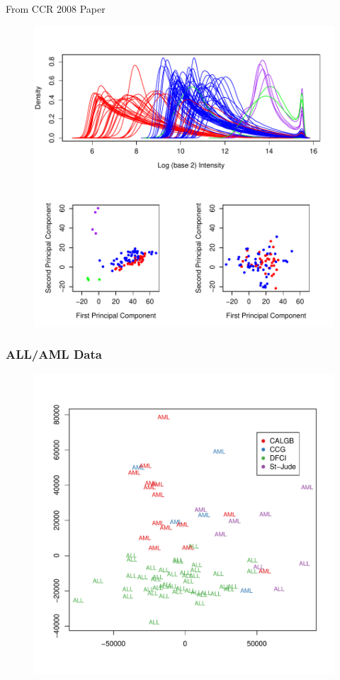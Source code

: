 \documentclass[xcolor=x11names,compress]{beamer}\usepackage[]{graphicx}\usepackage[]{color}
\begin{document}
\begin{frame}{From CCR 2008 Paper}
   \begin{figure}
   \centering
   \includegraphics[scale=0.45]{Figures/CCR-FIG1.pdf}
 \end{figure}
  
\end{frame}
\begin{frame}
  \frametitle{ALL/AML Data}

  \begin{figure}
   \centering
   \includegraphics[scale=0.45]{Figures/CTS-ALLAML-MDS.pdf}
 \end{figure}

\end{frame}
\end{document}
